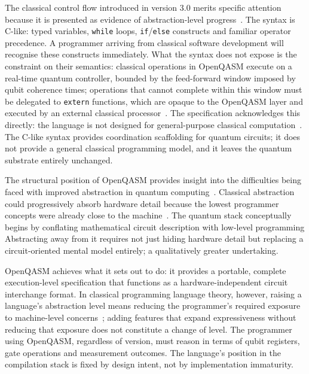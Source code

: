 The classical control flow introduced in version 3.0 merits specific attention because it is presented as evidence of abstraction-level progress~\cite{cross2022openqasm3}.
The syntax is C-like: typed variables, \texttt{while} loops, \texttt{if}/\texttt{else} constructs and familiar operator precedence.
A programmer arriving from classical software development will recognise these constructs immediately.
What the syntax does not expose is the constraint on their semantics: classical operations in OpenQASM execute on a real-time quantum controller, bounded by the feed-forward window imposed by qubit coherence times; operations that cannot complete within this window must be delegated to \texttt{extern} functions, which are opaque to the OpenQASM layer and executed by an external classical processor~\cite{cross2022openqasm3}.
The specification acknowledges this directly: the language is not designed for general-purpose classical computation~\cite{cross2022openqasm3}.
The C-like syntax provides coordination scaffolding for quantum circuits; it does not provide a general classical programming model, and it leaves the quantum substrate entirely unchanged.

The structural position of OpenQASM provides insight into the difficulties being faced with improved abstraction in quantum computing~\cite{ferreira2024qplusage}.
Classical abstraction could progressively absorb hardware detail because the lowest programmer concepts were already close to the machine~\cite{nunez_corrales2025betterabstractmachines}.
The quantum stack conceptually begins by conflating mathematical circuit description with low-level programming
Abstracting away from it requires not just hiding hardware detail but replacing a circuit-oriented mental model entirely; a qualitatively greater undertaking.

OpenQASM achieves what it sets out to do: it provides a portable, complete execution-level specification that functions as a hardware-independent circuit interchange format.
In classical programming language theory, however, raising a language's abstraction level means reducing the programmer's required exposure to machine-level concerns~\cite{scott2009plp}; adding features that expand expressiveness without reducing that exposure does not constitute a change of level.
The programmer using OpenQASM, regardless of version, must reason in terms of qubit registers, gate operations and measurement outcomes.
The language's position in the compilation stack is fixed by design intent, not by implementation immaturity.

